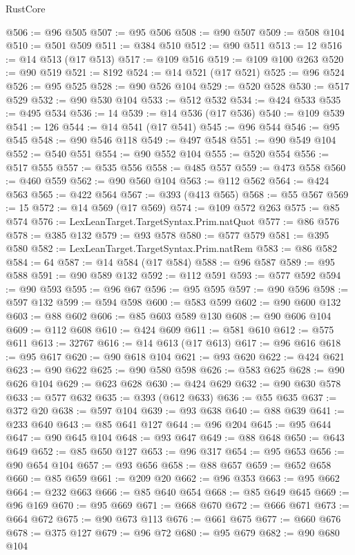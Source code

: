\begin{lexlean}{RustCore}
\begin{coremodule}
@506 := @96 @505
@507 := @95 @506
@508 := @90 @507
@509 := @508 @104
@510 := @501 @509
@511 := @384 @510
@512 := @90 @511
@513 := 12
@516 := @14 @513 (@17 @513)
@517 := @109 @516
@519 := @109 @100 @263
@520 := @90 @519
@521 := 8192
@524 := @14 @521 (@17 @521)
@525 := @96 @524
@526 := @95 @525
@528 := @90 @526 @104
@529 := @520 @528
@530 := @517 @529
@532 := @90 @530 @104
@533 := @512 @532
@534 := @424 @533
@535 := @495 @534
@536 := 14
@539 := @14 @536 (@17 @536)
@540 := @109 @539
@541 := 126
@544 := @14 @541 (@17 @541)
@545 := @96 @544
@546 := @95 @545
@548 := @90 @546 @118
@549 := @497 @548
@551 := @90 @549 @104
@552 := @540 @551
@554 := @90 @552 @104
@555 := @520 @554
@556 := @517 @555
@557 := @535 @556
@558 := @485 @557
@559 := @473 @558
@560 := @460 @559
@562 := @90 @560 @104
@563 := @112 @562
@564 := @424 @563
@565 := @422 @564
@567 := @393 (@413 @565)
@568 := @55 @567
@569 := 15
@572 := @14 @569 (@17 @569)
@574 := @109 @572 @263
@575 := @85 @574
@576 := LexLeanTarget.TargetSyntax.Prim.natQuot
@577 := @86 @576
@578 := @385 @132
@579 := @93 @578
@580 := @577 @579
@581 := @395 @580
@582 := LexLeanTarget.TargetSyntax.Prim.natRem
@583 := @86 @582
@584 := 64
@587 := @14 @584 (@17 @584)
@588 := @96 @587
@589 := @95 @588
@591 := @90 @589 @132
@592 := @112 @591
@593 := @577 @592
@594 := @90 @593
@595 := @96 @67
@596 := @95 @595
@597 := @90 @596
@598 := @597 @132
@599 := @594 @598
@600 := @583 @599
@602 := @90 @600 @132
@603 := @88 @602
@606 := @85 @603 @589 @130
@608 := @90 @606 @104
@609 := @112 @608
@610 := @424 @609
@611 := @581 @610
@612 := @575 @611
@613 := 32767
@616 := @14 @613 (@17 @613)
@617 := @96 @616
@618 := @95 @617
@620 := @90 @618 @104
@621 := @93 @620
@622 := @424 @621
@623 := @90 @622
@625 := @90 @580 @598
@626 := @583 @625
@628 := @90 @626 @104
@629 := @623 @628
@630 := @424 @629
@632 := @90 @630 @578
@633 := @577 @632
@635 := @393 (@612 @633)
@636 := @55 @635
@637 := @372 @20
@638 := @597 @104
@639 := @93 @638
@640 := @88 @639
@641 := @233 @640
@643 := @85 @641 @127
@644 := @96 @204
@645 := @95 @644
@647 := @90 @645 @104
@648 := @93 @647
@649 := @88 @648
@650 := @643 @649
@652 := @85 @650 @127
@653 := @96 @317
@654 := @95 @653
@656 := @90 @654 @104
@657 := @93 @656
@658 := @88 @657
@659 := @652 @658
@660 := @85 @659
@661 := @209 @20
@662 := @96 @353
@663 := @95 @662
@664 := @232 @663
@666 := @85 @640 @654
@668 := @85 @649 @645
@669 := @96 @169
@670 := @95 @669
@671 := @668 @670
@672 := @666 @671
@673 := @664 @672
@675 := @90 @673 @113
@676 := @661 @675
@677 := @660 @676
@678 := @375 @127
@679 := @96 @72
@680 := @95 @679
@682 := @90 @680 @104

\end{coremodule}
\end{lexlean}

